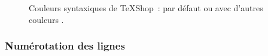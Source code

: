 \documentclass[11pt,french]{article}
\newcommand{\TS}{\textsf{\TeX Shop}}
\newcommand{\cmd}[1]{\textsf{#1}}
\newcommand{\mnu}[1]{\textsf{#1}}
\newcommand{\To}{\,\(\to\)\,}
\begin{document}

\begin{figure}
\centering
{}%
\qquad%
%
\caption[Couleurs syntaxiques de \TS]{Couleurs syntaxiques de \TS\ : par défaut  ou avec d'autres couleurs .}
\label{fig:SyntaxColors}
\end{figure}

\subsubsection{Numérotation des lignes}

%
\end{document}
